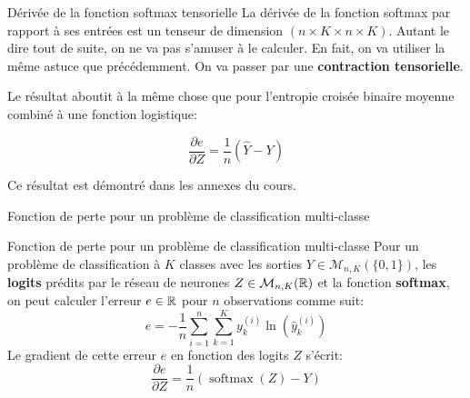 \begin{frame}{Dérivée de la fonction softmax tensorielle}
	La dérivée de la fonction softmax par rapport à ses entrées est un tenseur de dimension $(n\times K \times n \times K)$. Autant le dire tout de suite, on ne va pas s'amuser à le calculer. En fait, on va utiliser la même astuce que précédemment. On va passer par une \textbf{contraction tensorielle}.
	
	\vspace{0.5cm}
	
	Le résultat aboutit à la même chose que pour l'entropie croisée binaire moyenne combiné à une fonction logistique:
	
	\begin{equation*}
		\frac{\partial{e}}{\partial{Z}} = \frac{1}{n} \left(\hat{Y} - Y \right)
	\end{equation*}
	
	Ce résultat est démontré dans les annexes du cours.
	
\end{frame}

\begin{frame}{Fonction de perte pour un problème de classification multi-classe}
	\begin{block}{Fonction de perte pour un problème de classification multi-classe}
		Pour un problème de classification à $K$ classes avec les sorties $Y \in \mathcal{M}_{n,K}(\{0, 1\})$, les \textbf{logits} prédits par le réseau de neurones $Z \in \mathcal{M}_{n,K}(\mathbb{R})$ et la fonction \textbf{softmax}, on peut calculer l'erreur $e \in \mathbb{R}$ pour $n$ observations comme suit:
		\begin{equation*}
			e = - \frac{1}{n} \sum_{i=1}^n \sum_{k=1}^K y_k^{(i)} \ln{\left(\hat{y}_k^{(i)}\right)}
		\end{equation*}
		Le gradient de cette erreur $e$ en fonction des logits $Z$ s'écrit:
		\begin{equation*}
			\frac{\partial{e}}{\partial{Z}} = \frac{1}{n} \left(\operatorname{softmax}\left(Z\right) - Y\right)
		\end{equation*}
	\end{block}
\end{frame}

